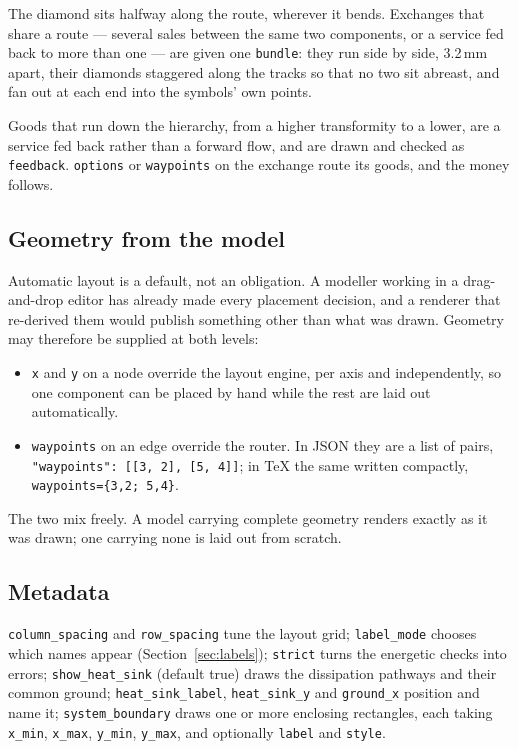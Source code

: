 \documentclass{article}
\begin{document}
The diamond sits halfway along the route, wherever it bends. Exchanges that
share a route --- several sales between the same two components, or a service
fed back to more than one --- are given one \texttt{bundle}: they run side by
side, 3.2\,mm apart, their diamonds staggered along the tracks so that no two
sit abreast, and fan out at each end into the symbols' own points.

Goods that run down the hierarchy, from a higher transformity to a lower, are a
service fed back rather than a forward flow, and are drawn and checked as
\texttt{feedback}. \texttt{options} or \texttt{waypoints} on the exchange route
its goods, and the money follows.

\subsection{Geometry from the model}

Automatic layout is a default, not an obligation. A modeller working in a
drag-and-drop editor has already made every placement decision, and a renderer
that re-derived them would publish something other than what was drawn. Geometry
may therefore be supplied at both levels:

\begin{itemize}
    \item \texttt{x} and \texttt{y} on a node override the layout engine, per
          axis and independently, so one component can be placed by hand while
          the rest are laid out automatically.
    \item \texttt{waypoints} on an edge override the router. In JSON they are a
          list of pairs, \texttt{"waypoints": [[3, 2], [5, 4]]}; in \TeX{} the
          same written compactly, \verb|waypoints={3,2; 5,4}|.
\end{itemize}

The two mix freely. A model carrying complete geometry renders exactly as it was
drawn; one carrying none is laid out from scratch.

\subsection{Metadata}

\texttt{column\_spacing} and \texttt{row\_spacing} tune the layout grid;
\texttt{label\_mode} chooses which names appear (Section~\ref{sec:labels});
\texttt{strict} turns the energetic checks into errors;
\texttt{show\_heat\_sink} (default true) draws the dissipation pathways and
their common ground; \texttt{heat\_sink\_label}, \texttt{heat\_sink\_y} and
\texttt{ground\_x} position and name it; \texttt{system\_boundary} draws one or more enclosing
rectangles, each taking \texttt{x\_min}, \texttt{x\_max}, \texttt{y\_min},
\texttt{y\_max}, and optionally \texttt{label} and \texttt{style}.
\end{document}
